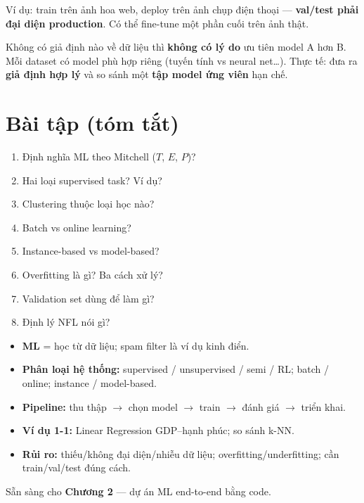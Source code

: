 \documentclass[12pt,a4paper]{article}
\begin{document}
\begin{luuy}[title={Dữ liệu production khác training}]
Ví dụ: train trên ảnh hoa web, deploy trên ảnh chụp điện thoại --- \textbf{val/test phải đại diện production}. Có thể fine-tune một phần cuối trên ảnh thật.
\end{luuy}

\begin{dinhly}[title={Định lý ``Không bữa trưa miễn phí'' (NFL, Wolpert 1996)}]
Không có giả định nào về dữ liệu thì \textbf{không có lý do} ưu tiên model A hơn B. Mỗi dataset có model phù hợp riêng (tuyến tính vs neural net\ldots). Thực tế: đưa ra \textbf{giả định hợp lý} và so sánh một \textbf{tập model ứng viên} hạn chế.
\end{dinhly}

\section{Bài tập (tóm tắt)}

\begin{vidu}[title={Câu hỏi ôn tập cuối chương}]
\begin{enumerate}
  \item Định nghĩa ML theo Mitchell ($T$, $E$, $P$)?
  \item Hai loại supervised task? Ví dụ?
  \item Clustering thuộc loại học nào?
  \item Batch vs online learning?
  \item Instance-based vs model-based?
  \item Overfitting là gì? Ba cách xử lý?
  \item Validation set dùng để làm gì?
  \item Định lý NFL nói gì?
\end{enumerate}
\end{vidu}

\begin{tongket}[title={Tổng kết Chương 1}]
\begin{itemize}
  \item \textbf{ML} = học từ dữ liệu; spam filter là ví dụ kinh điển.
  \item \textbf{Phân loại hệ thống:} supervised / unsupervised / semi / RL; batch / online; instance / model-based.
  \item \textbf{Pipeline:} thu thập $\to$ chọn model $\to$ train $\to$ đánh giá $\to$ triển khai.
  \item \textbf{Ví dụ 1-1:} Linear Regression GDP--hạnh phúc; so sánh k-NN.
  \item \textbf{Rủi ro:} thiếu/không đại diện/nhiễu dữ liệu; overfitting/underfitting; cần train/val/test đúng cách.
\end{itemize}
Sẵn sàng cho \textbf{Chương 2} --- dự án ML end-to-end bằng code.
\end{tongket}
\end{document}
